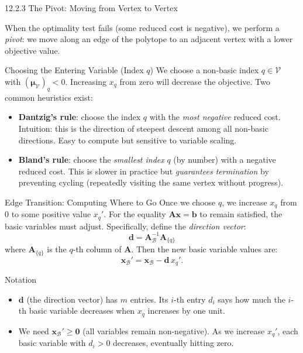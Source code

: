 \documentclass[aspectratio=169,10pt]{beamer}
\newcommand{\xv}{\mathbf{x}}
\newcommand{\bv}{\mathbf{b}}
\newcommand{\Av}{\mathbf{A}}
\newcommand{\muv}{\boldsymbol{\mu}}
\newcommand{\calB}{\mathcal{B}}
\newcommand{\calV}{\mathcal{V}}
\begin{document}
\begin{frame}[allowframebreaks]{12.2.3 The Pivot: Moving from Vertex to Vertex}

When the optimality test fails (some reduced cost is negative), we perform a
\emph{pivot}: we move along an edge of the polytope to an adjacent vertex with a
lower objective value.

\begin{block}{Choosing the Entering Variable (Index $q$)}
We choose a non-basic index $q \in \calV$ with $(\muv_\calV)_q < 0$.  Increasing
$x_q$ from zero will decrease the objective.  Two common heuristics exist:
\begin{itemize}
  \item \textbf{Dantzig's rule}: choose the index $q$ with the \emph{most negative}
        reduced cost.  Intuition: this is the direction of steepest descent among
        all non-basic directions.  Easy to compute but sensitive to variable scaling.
  \item \textbf{Bland's rule}: choose the \emph{smallest index} $q$ (by number)
        with a negative reduced cost.  This is slower in practice but
        \emph{guarantees termination} by preventing cycling (repeatedly visiting
        the same vertex without progress).
\end{itemize}
\end{block}

\begin{block}{Edge Transition: Computing Where to Go}
Once we choose $q$, we increase $x_q$ from $0$ to some positive value $x_q'$.
For the equality $\Av\xv = \bv$ to remain satisfied, the basic variables must adjust.
Specifically, define the \emph{direction vector}:
\[
  \mathbf{d} = \Av_\calB^{-1}\Av_{\{q\}}
\]
where $\Av_{\{q\}}$ is the $q$-th column of $\Av$.  Then the new basic variable
values are:
\[
  \xv_\calB' = \xv_\calB - \mathbf{d}\,x_q'.
\]
\end{block}

\begin{block}{Notation}
\begin{itemize}
  \item $\mathbf{d}$ (the direction vector) has $m$ entries.  Its $i$-th entry
        $d_i$ says how much the $i$-th basic variable decreases when $x_q$
        increases by one unit.
  \item We need $\xv_\calB' \ge \mathbf{0}$ (all variables remain non-negative).
        As we increase $x_q'$, each basic variable with $d_i > 0$ decreases,
        eventually hitting zero.
\end{itemize}
\end{block}


\end{frame}
\end{document}
